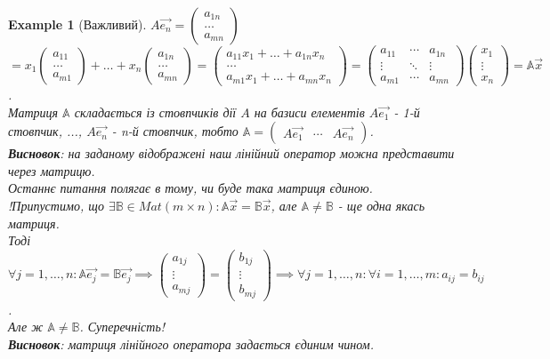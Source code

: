 \documentclass[a4paper, 10pt]{article}
\theoremstyle{theoremdd}
\theoremstyle{theoremdd}
\theoremstyle{theoremdd}
\theoremstyle{theoremdd}
\newtheorem{example}[theorem]{Example}
\theoremstyle{theoremdd}
\theoremstyle{theoremdd}
\theoremstyle{theoremdd}
\theoremstyle{theoremdd}
\begin{document}
\begin{example}[Важливий]
	$A\vec{e_n} = \begin{pmatrix} a_{1n} \\ \dots \\ a_{mn} \end{pmatrix}$\\
$\boxed{=} x_1 \begin{pmatrix} a_{11} \\ \dots \\ a_{m1} \end{pmatrix} + \dots +x_n \begin{pmatrix} a_{1n} \\ \dots \\ a_{mn} \end{pmatrix} = 	
\begin{pmatrix}
	a_{11}x_1 + \dots + a_{1n}x_n \\
	\dots \\
	a_{m1}x_1 + \dots + a_{mn}x_n
	\end{pmatrix} = \begin{pmatrix}
	a_{11} & \cdots &  a_{1n} \\
	\vdots & \ddots & \vdots \\
	a_{m1} & \cdots & a_{mn}
	\end{pmatrix} \begin{pmatrix}
	x_1 \\ \vdots \\ x_n
	\end{pmatrix} = \mathbb{A}\vec{x}$.\\
	Матриця $\mathbb{A}$ складається із стовпчиків дії $A$ на базиси елементів $A\vec{e_1}$ - 1-й стовпчик, ..., $A\vec{e_n}$ - n-й стовпчик, тобто $\mathbb{A} = \begin{pmatrix} A\vec{e_1} & \cdots & A\vec{e_n} \end{pmatrix}$.\\
	\textbf{Висновок}: на заданому відображені наш лінійний оператор можна представити через матрицю.
	\bigskip \\
	Останнє питання полягає в тому, чи буде така матриця єдиною.\\
	!Припустимо, що $\exists \mathbb{B} \in Mat(m \times n): \mathbb{A} \vec{x} = \mathbb{B} \vec{x}$, але $\mathbb{A} \neq \mathbb{B}$ - ще одна якась матриця.\\
	Тоді $\forall j =1,\dots,n: \mathbb{A} \vec{e_j} = \mathbb{B} \vec{e_j} \implies \begin{pmatrix} a_{1j} \\ \vdots \\ a_{mj} \end{pmatrix} = \begin{pmatrix} b_{1j} \\ \vdots \\ b_{mj} \end{pmatrix} \implies \forall j=1,\dots,n: \forall i = 1,\dots,m: a_{ij} = b_{ij}$.\\
	Але ж $\mathbb{A} \neq \mathbb{B}$. Суперечність! \\
	\textbf{Висновок}: матриця лінійного оператора задається єдиним чином.
	\end{example}
	
\end{document}
